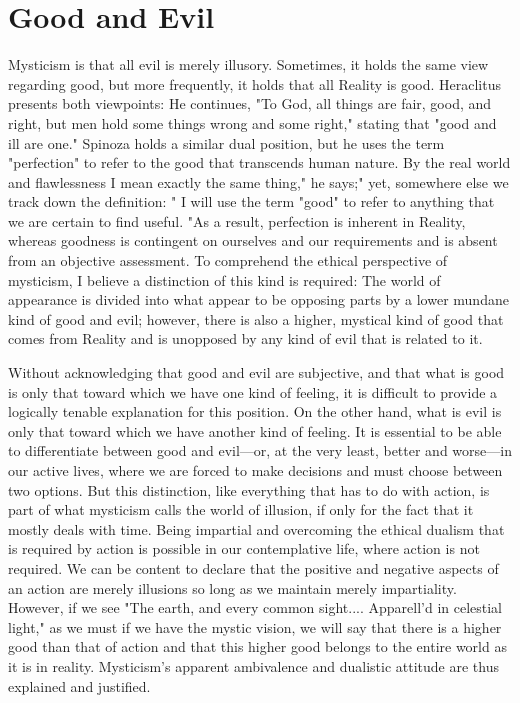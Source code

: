 \documentclass[a4paper,12pt]{book}[2004/02/16]
\theoremstyle{ilemma}
\theoremstyle{itheorem}
\theoremstyle{iother}
\theoremstyle{icorollary}
\theoremstyle{numcorollary}
\theoremstyle{idefinition}
\begin{document}
\section{Good and Evil}
Mysticism is that all evil is merely illusory. Sometimes, it holds the same view regarding good, but more frequently, it holds that all Reality is good. Heraclitus presents both viewpoints: He continues, "To God, all things are fair, good, and right, but men hold some things wrong and some right," stating that "good and ill are one." Spinoza holds a similar dual position, but he uses the term "perfection" to refer to the good that transcends human nature. By the real world and flawlessness I mean exactly the same thing," he says;"
yet, somewhere else we track down the definition: " I will use the term "good" to refer to anything that we are certain to find useful. "As a result, perfection is inherent in Reality, whereas goodness is contingent on ourselves and our requirements and is absent from an objective assessment. To comprehend the ethical perspective of mysticism, I believe a distinction of this kind is required: The world of appearance is divided into what appear to be opposing parts by a lower mundane kind of good and evil; however, there is also a higher, mystical kind of good that comes from Reality and is unopposed by any kind of evil that is related to it.

Without acknowledging that good and evil are subjective, and that what is good is only that toward which we have one kind of feeling, it is difficult to provide a logically tenable explanation for this position. On the other hand, what is evil is only that toward which we have another kind of feeling. It is essential to be able to differentiate between good and evil—or, at the very least, better and worse—in our active lives, where we are forced to make decisions and must choose between two options. But this distinction, like everything that has to do with action, is part of what mysticism calls the world of illusion, if only for the fact that it mostly deals with time. Being impartial and overcoming the ethical dualism that is required by action is possible in our contemplative life, where action is not required. We can be content to declare that the positive and negative aspects of an action are merely illusions so long as we maintain merely impartiality. However, if we see "The earth, and every common sight.... Apparell'd in celestial light," as we must if we have the mystic vision, we will say that there is a higher good than that of action and that this higher good belongs to the entire world as it is in reality. Mysticism's apparent ambivalence and dualistic attitude are thus explained and justified.
\end{document}
